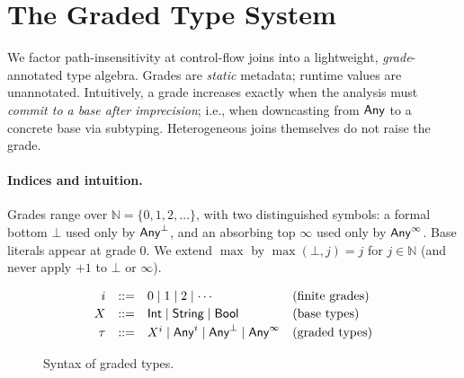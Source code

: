 
\section{The \textsf{Graded} Type System}
\label{sec:types}

We factor path-insensitivity at control-flow joins into a lightweight, \emph{grade}-annotated type algebra. Grades are \emph{static} metadata; runtime values are unannotated. Intuitively, a grade increases exactly when the analysis must \emph{commit to a base after imprecision}; i.e., when downcasting from $\mathsf{Any}$ to a concrete base via subtyping. Heterogeneous joins themselves do not raise the grade.

\paragraph{Indices and intuition.}
Grades range over $\mathbb{N}=\{0,1,2,\dots\}$, with two distinguished symbols:
a formal bottom $\bot$ used only by $\mathsf{Any}^{\bot}$, and an absorbing top $\infty$ used only by $\mathsf{Any}^{\infty}$.
Base literals appear at grade $0$.
We extend $\max$ by $\max(\bot,j)=j$ for $j\in\mathbb{N}$ (and never apply $+1$ to $\bot$ or $\infty$).

\begin{figure}[t]
\centering
\[
\begin{array}{rcll}
i &::=& 0 \mid 1 \mid 2 \mid \cdots & \text{(finite grades)}\\[2pt]
X &::=& \mathsf{Int} \mid \mathsf{String} \mid \mathsf{Bool} & \text{(base types)}\\[2pt]
\tau &::=& X^{i} \mid \mathsf{Any}^{i} \mid \mathsf{Any}^{\bot} \mid \mathsf{Any}^{\infty} & \text{(graded types)}
\end{array}
\]
\vspace{-2mm}
\caption{Syntax of graded types.}
\label{fig:syntax}
\end{figure}

